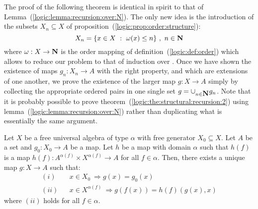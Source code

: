 The proof of the following theorem is identical in spirit to that of
Lemma~(\ref{logic:lemma:recursion:over:N}). The only new idea is the
introduction of the subsets $X_{n}\subseteq X$ of
proposition~(\ref{logic:prop:order:structure}):
    \[
    X_{n}=\{x\in X\ :\ \om(x)\leq n\}\ ,\ n\in\N
    \]
where $\mbox{$\omega$}:X\to\mbox{$\bf N$}$ is the order mapping of
definition~(\ref{logic:def:order}) which allows to reduce our
problem to that of induction over \N. Once we have shown the
existence of maps $g_{n}:X_{n}\to A$ with the right property, and
which are extensions of one another, we prove the existence of the
larger map $g:X\to A$ simply by collecting the appropriate ordered
pairs in one single set $g=\cup_{n\in\mbox{$\bf N$}}g_{n}$. Note that it is
probably possible to prove
theorem~(\ref{logic:the:structural:recursion:2}) using
lemma~(\ref{logic:lemma:recursion:over:N}) rather than duplicating
what is essentially the same argument. 
\begin{theorem}\label{logic:the:structural:recursion:2}
Let $X$ be a free universal algebra of type $\alpha$  with free
generator $X_{0}\subseteq X$. Let $A$ be a set and $g_{0}:X_{0}\to
A$ be a map. Let $h$ be a map with domain $\alpha$ such that $h(f)$
is a map $h(f):A^{\alpha(f)}\times X^{\alpha(f)}\to A$ for all
$f\in\alpha$. Then, there exists a unique map $g:X\to A$ such that:
    \begin{eqnarray*}
    (i)&& x\in X_{0}\ \Rightarrow g(x)=g_{0}(x)\\
    (ii)&& x\in X^{\alpha(f)}\ \Rightarrow g(f(x)) = h(f)(g(x),x)
    \end{eqnarray*}
where $(ii)$ holds for all $f\in\alpha$.
\end{theorem}
